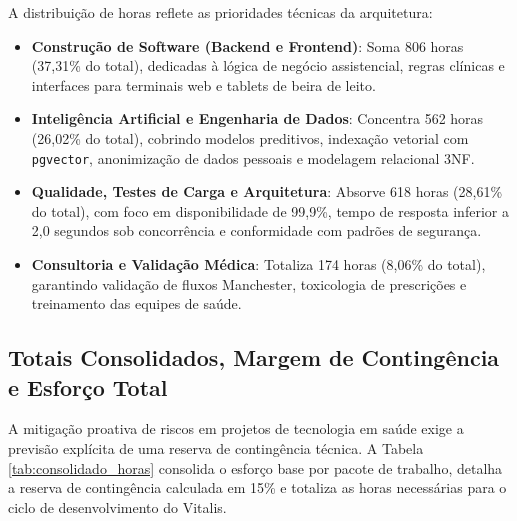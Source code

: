 A distribuição de horas reflete as prioridades técnicas da arquitetura:
\begin{itemize}[leftmargin=*]
    \item \textbf{Construção de Software (Backend e Frontend)}: Soma 806 horas (37,31\% do total), dedicadas à lógica de negócio assistencial, regras clínicas e interfaces para terminais web e tablets de beira de leito.
    \item \textbf{Inteligência Artificial e Engenharia de Dados}: Concentra 562 horas (26,02\% do total), cobrindo modelos preditivos, indexação vetorial com \texttt{pgvector}, anonimização de dados pessoais e modelagem relacional 3NF.
    \item \textbf{Qualidade, Testes de Carga e Arquitetura}: Absorve 618 horas (28,61\% do total), com foco em disponibilidade de 99,9\%, tempo de resposta inferior a 2,0 segundos sob concorrência e conformidade com padrões de segurança.
    \item \textbf{Consultoria e Validação Médica}: Totaliza 174 horas (8,06\% do total), garantindo validação de fluxos Manchester, toxicologia de prescrições e treinamento das equipes de saúde.
\end{itemize}

\subsection{Totais Consolidados, Margem de Contingência e Esforço Total}

A mitigação proativa de riscos em projetos de tecnologia em saúde exige a previsão explícita de uma reserva de contingência técnica. A Tabela \ref{tab:consolidado_horas} consolida o esforço base por pacote de trabalho, detalha a reserva de contingência calculada em 15\% e totaliza as horas necessárias para o ciclo de desenvolvimento do Vitalis.

